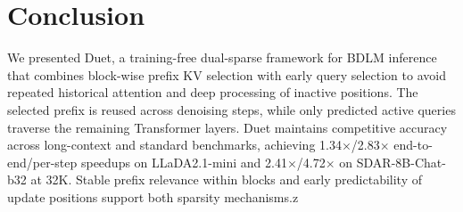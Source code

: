 \section{Conclusion}

We presented Duet, a training-free dual-sparse framework for BDLM inference that combines block-wise prefix KV selection with early query selection to avoid repeated historical attention and deep processing of inactive positions. The selected prefix is reused across denoising steps, while only predicted active queries traverse the remaining Transformer layers. Duet maintains competitive accuracy across long-context and standard benchmarks, achieving 1.34$\times$/2.83$\times$ end-to-end/per-step speedups on LLaDA2.1-mini and 2.41$\times$/4.72$\times$ on SDAR-8B-Chat-b32 at 32K. Stable prefix relevance within blocks and early predictability of update positions support both sparsity mechanisms.z


